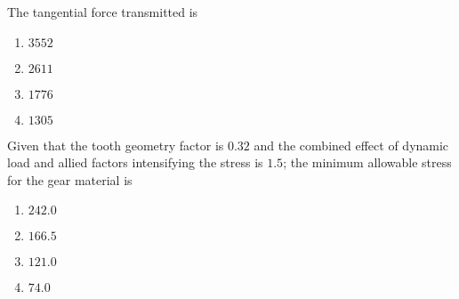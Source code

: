     \item  The tangential force transmitted  is
    \begin{enumerate}
        \item $3552$
        \item $2611$
        \item $1776$
        \item $1305$
    \end{enumerate}

    \item  Given that the tooth geometry factor is $0.32$ and the combined effect of dynamic load and allied factors intensifying the stress is $1.5$; the minimum allowable stress  for the gear material is
    \begin{enumerate}
        \item $242.0$
        \item $166.5$
        \item $121.0$
        \item $74.0$
    \end{enumerate}

